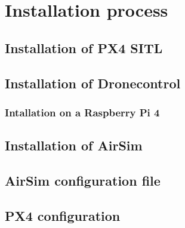 \chapter{Installation process}
\section{Installation of PX4 SITL}
\label{app:install-px4}
\section{Installation of Dronecontrol}
\label{app:install-dronecontrol}
\subsection{Intallation on a Raspberry Pi 4}
\label{app:install-dronecontrol-rpi}
\section{Installation of AirSim}
\label{app:install-airsim}
\section{AirSim configuration file}
\label{app:airsim-config}
\section{PX4 configuration}
